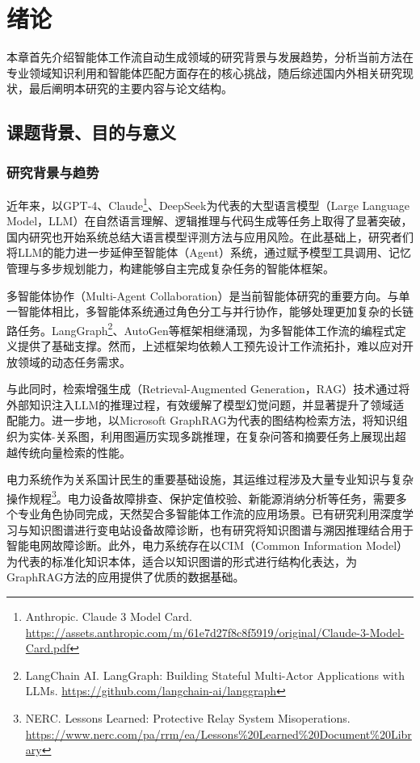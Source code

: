 \section{绪\hspace{1em}论}

本章首先介绍智能体工作流自动生成领域的研究背景与发展趋势，分析当前方法在专业领域知识利用和智能体匹配方面存在的核心挑战，随后综述国内外相关研究现状，最后阐明本研究的主要内容与论文结构。

\subsection{课题背景、目的与意义}

\subsubsection{研究背景与趋势}

近年来，以GPT-4、Claude\footnote{Anthropic. Claude 3 Model Card. \url{https://assets.anthropic.com/m/61e7d27f8c8f5919/original/Claude-3-Model-Card.pdf}}、DeepSeek为代表的大型语言模型（Large Language Model，LLM）在自然语言理解、逻辑推理与代码生成等任务上取得了显著突破\cite{openai2023gpt4}，国内研究也开始系统总结大语言模型评测方法与应用风险\cite{luo2024llmeval}。在此基础上，研究者们将LLM的能力进一步延伸至智能体（Agent）系统，通过赋予模型工具调用、记忆管理与多步规划能力，构建能够自主完成复杂任务的智能体框架。

多智能体协作（Multi-Agent Collaboration）是当前智能体研究的重要方向。与单一智能体相比，多智能体系统通过角色分工与并行协作，能够处理更加复杂的长链路任务。LangGraph\footnote{LangChain AI. LangGraph: Building Stateful Multi-Actor Applications with LLMs. \url{https://github.com/langchain-ai/langgraph}}、AutoGen\cite{wu2023autogen}等框架相继涌现，为多智能体工作流的编程式定义提供了基础支撑。然而，上述框架均依赖人工预先设计工作流拓扑，难以应对开放领域的动态任务需求。

与此同时，检索增强生成（Retrieval-Augmented Generation，RAG）技术通过将外部知识注入LLM的推理过程，有效缓解了模型幻觉问题，并显著提升了领域适配能力\cite{lewis2020retrieval}。进一步地，以Microsoft GraphRAG\cite{edge2024graphrag}为代表的图结构检索方法，将知识组织为实体-关系图，利用图遍历实现多跳推理，在复杂问答和摘要任务上展现出超越传统向量检索的性能。

电力系统作为关系国计民生的重要基础设施，其运维过程涉及大量专业知识与复杂操作规程\footnote{NERC. Lessons Learned: Protective Relay System Misoperations. \url{https://www.nerc.com/pa/rrm/ea/Lessons\%20Learned\%20Document\%20Library}}。电力设备故障排查、保护定值校验、新能源消纳分析等任务，需要多个专业角色协同完成，天然契合多智能体工作流的应用场景。已有研究利用深度学习与知识图谱进行变电站设备故障诊断\cite{xiao2022substationkg}，也有研究将知识图谱与溯因推理结合用于智能电网故障诊断\cite{yao2024smartgridkg}。此外，电力系统存在以CIM（Common Information Model）为代表的标准化知识本体，适合以知识图谱的形式进行结构化表达，为GraphRAG方法的应用提供了优质的数据基础。

